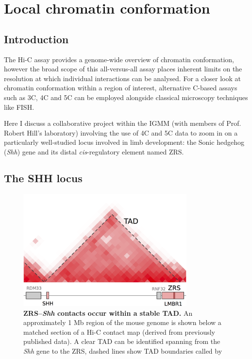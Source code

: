 \documentclass[a4paper,11pt,oneside]{book}
\begin{document}

\chapter{Local chromatin conformation}\label{chap:shh}

\section{Introduction}

The Hi-C assay provides a genome-wide overview of chromatin conformation, however the broad scope of this all-versus-all assay places inherent limits on the resolution at which individual interactions can be analysed. For a closer look at chromatin conformation within a region of interest, alternative C-based assays such as 3C, 4C and 5C can be employed alongside classical microscopy techniques like FISH.

Here I discuss a collaborative project within the IGMM (with members of Prof. Robert Hill's laboratory) involving the use of 4C and 5C data to zoom in on a particularly well-studied locus involved in limb development: the Sonic hedgehog (\emph{Shh}) gene and its distal \emph{cis}-regulatory element named ZRS.

\section{The SHH locus}

\begin{figure}
\begin{center} 
\includegraphics[width=3.5in]{shhtad.png}
\captionsetup{width=\textwidth} 
\caption[ZRS--\emph{Shh} contacts occur within a stable TAD.]{ {\bf ZRS--\emph{Shh} contacts occur within a stable TAD. }
An approximately 1 Mb region of the mouse genome is shown below a matched section of a Hi-C contact map (derived from previously published data\cite{Dixon2012}). A clear TAD can be identified spanning from the \emph{Shh} gene to the ZRS, dashed lines show TAD boundaries called by \citet{Dixon2012} %
}\label{fig:shhtad}
\end{center} 
\end{figure} 
\end{document}

